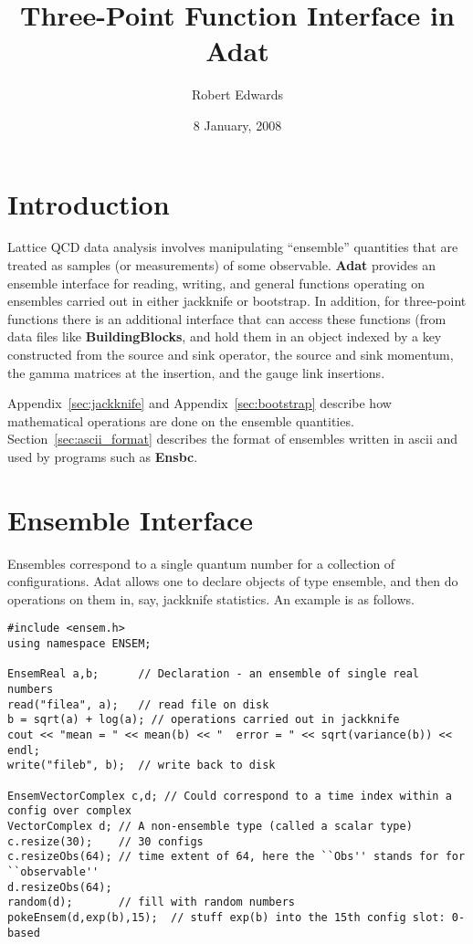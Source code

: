 \documentclass[11pt]{article}
\begin{document}
\title{Three-Point Function Interface in Adat}

\author{Robert Edwards}

\date{8 January, 2008}
\maketitle

\section{Introduction}

Lattice QCD data analysis involves manipulating ``ensemble''
quantities that are treated as samples (or measurements) of some
observable. {\bf Adat} provides an ensemble interface for reading,
writing, and general functions operating on ensembles carried out in
either jackknife or bootstrap. In addition, for three-point functions
there is an additional interface that can access these functions (from
data files like {\bf BuildingBlocks}, and hold them in an object
indexed by a key constructed from the source and sink operator, the
source and sink momentum, the gamma matrices at the insertion, and the
gauge link insertions.

Appendix~\ref{sec:jackknife} and Appendix~\ref{sec:bootstrap} describe
how mathematical operations are done on the ensemble quantities. 
Section~\ref{sec:ascii_format} describes the format of ensembles written
in ascii and used by programs such as {\bf Ensbc}.

\section{Ensemble Interface}\label{sec:ensemble}

Ensembles correspond to a single quantum number for a collection
of configurations. Adat allows one to declare objects of type ensemble,
and then do operations on them in, say, jackknife statistics. 
An example is as follows.
\begin{verbatim}
#include <ensem.h>
using namespace ENSEM;

EnsemReal a,b;      // Declaration - an ensemble of single real numbers
read("filea", a);   // read file on disk
b = sqrt(a) + log(a); // operations carried out in jackknife
cout << "mean = " << mean(b) << "  error = " << sqrt(variance(b)) << endl;
write("fileb", b);  // write back to disk

EnsemVectorComplex c,d; // Could correspond to a time index within a config over complex
VectorComplex d; // A non-ensemble type (called a scalar type)
c.resize(30);    // 30 configs
c.resizeObs(64); // time extent of 64, here the ``Obs'' stands for for ``observable''
d.resizeObs(64);
random(d);       // fill with random numbers
pokeEnsem(d,exp(b),15);  // stuff exp(b) into the 15th config slot: 0-based
\end{verbatim}
\end{document}
